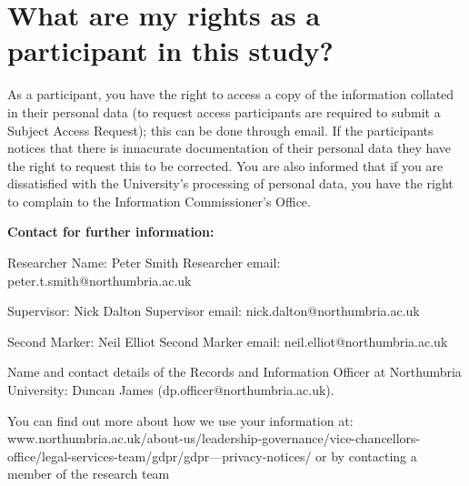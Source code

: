 \section{What are my rights as a participant in this study?}
As a participant, you have the right to access a copy of the information collated in their personal data (to request access participants are required to submit a Subject Access Request); this can be done through email. If the participants notices that there is innacurate documentation of their personal data they have the right to request this to be corrected. You are also informed that if you are dissatisfied with the University’s processing of personal data, you have the right to complain to the Information Commissioner’s Office. 
\bigskip
\begin{center}\textbf{
    Contact for further information: }
    
Researcher Name: Peter Smith
Researcher email: peter.t.smith@northumbria.ac.uk
 
Supervisor: Nick Dalton 
Supervisor email: nick.dalton@northumbria.ac.uk

Second Marker: Neil Elliot
Second Marker email: neil.elliot@northumbria.ac.uk

Name and contact details of the Records and Information Officer at Northumbria University: Duncan James (dp.officer@northumbria.ac.uk). 

You can find out more about how we use your information at: www.northumbria.ac.uk/about-us/leadership-governance/vice-chancellors-office/legal-services-team/gdpr/gdpr---privacy-notices/ 
or by contacting a member of the research team

\end{center}